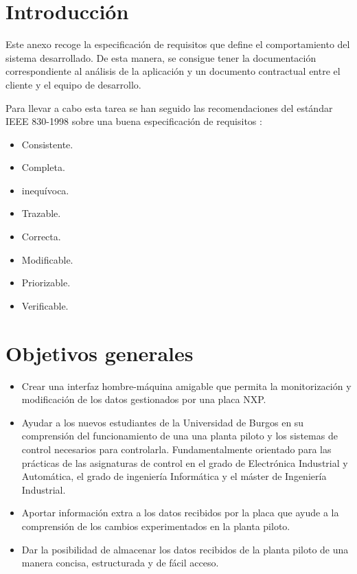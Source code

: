 
\section{Introducción}

Este anexo recoge la especificación de requisitos que define el comportamiento del sistema desarrollado. De esta manera, se consigue tener la documentación correspondiente al análisis de la aplicación y un documento contractual entre el cliente y el equipo de desarrollo.

Para llevar a cabo esta tarea se han seguido las recomendaciones del estándar IEEE 830-1998 sobre una buena especificación de requisitos \cite{web:ieee830}:
\begin{itemize}
	\item Consistente.
	\item Completa.
	\item inequívoca.
	\item Trazable.
	\item Correcta.
	\item Modificable.
	\item Priorizable.
	\item Verificable.
\end{itemize}

\section{Objetivos generales}

\begin{itemize}
	\item Crear una interfaz hombre-máquina amigable que permita la monitorización y modificación de los datos gestionados por una placa NXP.
	\item Ayudar a los nuevos estudiantes de la Universidad de Burgos en su comprensión del funcionamiento de una una planta piloto y los sistemas de control necesarios para controlarla. Fundamentalmente orientado para las prácticas de las asignaturas de control en el grado de Electrónica Industrial y Automática, el grado de ingeniería Informática y el máster de Ingeniería Industrial.
	\item Aportar información extra a los datos recibidos por la placa que ayude a la comprensión de los cambios experimentados en la planta piloto.
	\item Dar la posibilidad de almacenar los datos recibidos de la planta piloto de una manera concisa, estructurada y de fácil acceso.
\end{itemize}

